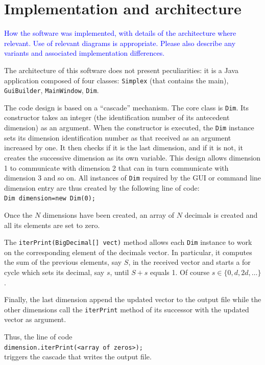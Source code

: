 \documentclass{jors}
\begin{document}
\section*{Implementation and architecture}

\textcolor{blue}{How the software was implemented, with details of the architecture where relevant. Use of relevant diagrams is appropriate. Please also describe any variants and associated implementation differences.}

The architecture of this software does not present peculiarities: 
it is a Java application composed of four classes: 
\verb+Simplex+ (that contains the main), \verb+GuiBuilder+, \verb+MainWindow+, \verb+Dim+.

The code design is based on a ``cascade'' mechanism.
The core class is \verb+Dim+. Its constructor takes an integer (the identification number of its antecedent dimension) as an argument. When the constructor is executed, the \verb+Dim+ instance sets its dimension identification number as that received as an argument increased by one. It then checks if it is the last dimension, and if it is not, it creates the successive dimension as its own variable. This design allows dimension 1 to communicate with dimension 2 that can in turn communicate with dimension 3 and so on. All instances of \verb+Dim+ required by the GUI or command line dimension entry are thus created by the following line of code:\\
\verb+Dim dimension=new Dim(0);+

Once the $N$ dimensions have been created, an array of $N$ decimals is created and all its elements are set to zero.  

The \verb+iterPrint(BigDecimal[] vect)+ method allows each \verb+Dim+ instance to work on the corresponding element of the decimals vector. In particular, it computes the sum of the previous elements, say $S$, in the received vector and starts a for cycle which sets its decimal, say $s$, until $S+s$ equals 1. Of course $s \in \{0,d, 2d, \ldots\}$.   

Finally, the last dimension append the updated vector to the output file while the other dimensions call the \verb+iterPrint+ method of its successor with the updated vector as argument.

Thus, the line of code\\ \verb+dimension.iterPrint(<array of zeros>);+\\ triggers the cascade that writes the output file.
\end{document}
